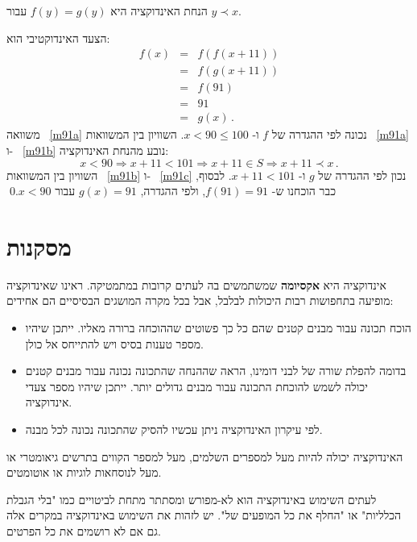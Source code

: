 \noindent{}%
הנחת האינדוקציה היא
$f(y) = g(y)$
עבור
$y\prec x$.

\noindent{}%
הצעד האינדוקטיבי הוא:
\vspace*{-1ex}
\begin{eqnarray}
f(x) &=& f(f(x+11))\label{m91a}\\
&=& f(g(x+11))\label{m91b}\\
&=& f(91)\label{m91c}\\
&=& 91\label{m91d}\\
&=& g(x)\,.
\end{eqnarray}
משוואה%
~\ref{m91a}
נכונה לפי ההגדרה של
$f$
ו-%
$x<90\leq 100$.
השוויון בין המשוואות
~\ref{m91a}
ו-%
~\ref{m91b}
נובע מהנחת האינדוקציה:
\[
x < 90 \Rightarrow x+11< 101 \Rightarrow x+11\in S \Rightarrow x+11 \prec x\,.
\]
השוויון בין המשוואות%
~\ref{m91b}
ו-%
~\ref{m91c}
נכון לפי ההגדרה של
$g$
ו-%
$x+11 < 101$.
לבסוף, כבר הוכחנו ש-%
$f(91)=91$,
ולפי ההגדרה,
$g(x)=91$
עבור
$x<90$.\qed



\chapter{%
מסקנות%
}\label{s.conclusion}

אינדוקציה היא
\textbf{אקסיומה}
שמשתמשים בה לעתים קרובות במתמטיקה. ראינו שאינדוקציה מופיעה בתחפושות רבות היכולות לבלבל, אבל בכל מקרה המושגים הבסיסיים הם אחידים:
\begin{itemize}
\item
הוכח תכונה עבור מבנים קטנים שהם כל כך פשוטים שההוכחה ברורה מאליו. ייתכן שיהיו מספר טענות בסיס ויש להתייחס אל כולן.
\item
בדומה להפלת שורה של לבני דומינו, הראה שההנחה שהתכונה נכונה עבור מבנים קטנים יכולה לשמש להוכחת התכונה עבור מבנים גדולים יותר. ייתכן שיהיו מספר צעדי אינדוקציה. 
\item
לפי עיקרון האינדוקציה ניתן עכשיו להסיק שהתכונה נכונה לכל מבנה.
\end{itemize}

האינדוקציה יכולה להיות מעל למספרים השלמים, מעל למספר הקווים בתרשים גיאומטרי או מעל לנוסחאות לוגיות או אוטומטים.

לעתים השימוש באינדוקציה הוא לא-מפורש ומסתתר מתחת לביטויים כמו "בלי הגבלת הכלליות" או "החלף את כל המופעים של". יש לזהות את השימוש באינדוקציה במקרים אלה גם אם לא רושמים את כל הפרטים.

